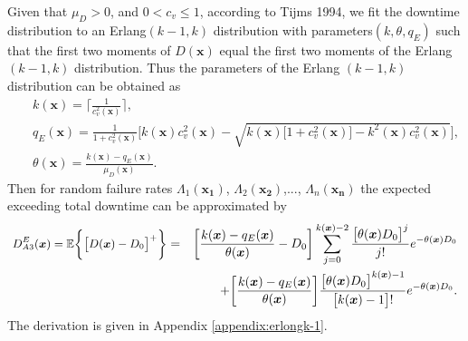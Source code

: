\documentclass[preprint,12pt]{elsarticle}
\begin{document}
\normalsize
Given that $\mu_{D}>0$, and $0<c_{v}\leq 1$, according to Tijms 1994, we fit the downtime distribution to an Erlang$(k-1,k)$ distribution with parameters$(k,\theta,q_{E})$ such that the first two moments of $D(\boldsymbol{x})$ equal the first two moments of the Erlang $(k-1,k)$ distribution. Thus the parameters of the Erlang $(k-1,k)$ distribution can be obtained as
\small
\begin{eqnarray}
&&k(\boldsymbol{x}) = \lceil \frac{1}{c_{v}^{2}(\boldsymbol{x})} \rceil, \label{k1}\\
&&q_{E}(\boldsymbol{x})= \frac{1}{1+c^{2}_{v}(\boldsymbol{x})}\bigg[k(\boldsymbol{x})c^{2}_{v}(\boldsymbol{x})-\sqrt{k(\boldsymbol{x})\big[1+c^{2}_{v}(\boldsymbol{x})\big]-k^{2}(\boldsymbol{x})c^{2}_{v}(\boldsymbol{x})} \bigg], \label{q1}\\
&&\theta(\boldsymbol{x}) = \frac{k(\boldsymbol{x})-q_{E}(\boldsymbol{x})}{\mu_{D}(\boldsymbol{x})}. \label{theta1}
\end{eqnarray}
\normalsize
Then for random failure rates $\Lambda_{1}(\boldsymbol{x_{1}})$, $\Lambda_{2}(\boldsymbol{x_{2}})$,..., $\Lambda_{n}(\boldsymbol{x_{n}})$ the expected exceeding total downtime can be approximated by
\begin{eqnarray}
\small
D_{A3}^{E}(\boldsymbol{x})=\mathbb{E}\bigg\{\big[D(\boldsymbol{x})-D_{0}\big]^{+}\bigg\}
&=&\bigg[\frac{k(\boldsymbol{x})-q_{E}(\boldsymbol{x})}{\theta(\boldsymbol{x})}-D_{0}\bigg]\sum_{j=0}^{k(\boldsymbol{x})-2}{\frac{\big[\theta(\boldsymbol{x}) D_{0}\big]^j}{j!}e^{-\theta(\boldsymbol{x})D_{0}}}\nonumber\\
&&+\bigg[\frac{k(\boldsymbol{x})-q_{E}(\boldsymbol{x})}{\theta(\boldsymbol{x})}\bigg]\frac{\big[\theta(\boldsymbol{x})D_{0}\big]^{k(\boldsymbol{x})-1}}{\big[k(\boldsymbol{x})-1\big]!}e^{-\theta(\boldsymbol{x})D_{0}}.
\label{EXD1}
\end{eqnarray}
\normalsize
The derivation is given in Appendix \ref{appendix:erlongk-1}.
\end{document}
